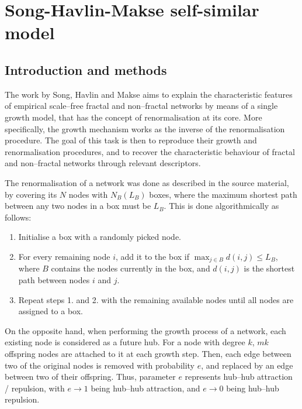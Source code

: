 \chapter{Song-Havlin-Makse self-similar model}


\section{Introduction and methods}
 
The work by Song, Havlin and Makse \cite{song2006origins} aims to explain the characteristic features of empirical scale--free fractal and non--fractal networks by means of a single growth model, that has the concept of renormalisation at its core. More specifically, the growth mechanism works as the inverse of the renormalisation procedure. The goal of this task is then to reproduce their growth and renormalisation procedures, and to recover the characteristic behaviour of fractal and non--fractal networks through relevant descriptors.

The renormalisation of a network was done as described in the source material, by covering its $N$ nodes with $N_B(L_B)$ boxes, where the maximum shortest path between any two nodes in a box must be $L_B$. This is done algorithmically as follows:

\begin{enumerate}
	\item Initialise a box with a randomly picked node.
	\item For every remaining node $i$, add it to the box if $\max_{j\in B} d(i,j) \leq L_B$, where $B$ contains the nodes currently in the box, and $d(i,j)$ is the shortest path between nodes $i$ and $j$.
	\item Repeat steps 1. and 2. with the remaining available nodes until all nodes are assigned to a box.
\end{enumerate}

On the opposite hand, when performing the growth process of a network, each existing node is considered as a future hub. For a node with degree $k$, $mk$ offspring nodes are attached to it at each growth step. Then, each edge between two of the original nodes is removed with probability $e$, and replaced by an edge between two of their offspring. Thus, parameter $e$ represents hub--hub attraction / repulsion, with $e\rightarrow1$ being hub--hub attraction, and $e\rightarrow0$ being hub--hub repulsion.

